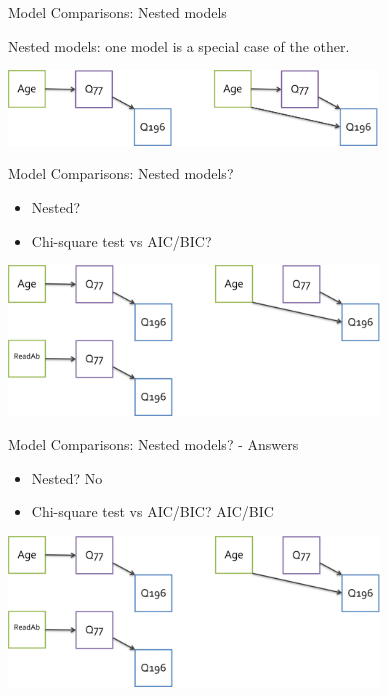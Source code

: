 \documentclass[10pt]{beamer}\usepackage[]{graphicx}\usepackage[]{xcolor}
\begin{document}
%
\begin{frame}{Model Comparisons: Nested models}

Nested models: one model is a special case of the other.

\vspace*{5mm}

\includegraphics[height=2cm,keepaspectratio=T] {nesting1.png}

\end{frame}
%
\begin{frame}{Model Comparisons: Nested models?}
\begin{itemize}
  \item{Nested?}
  \item{Chi-square test vs AIC/BIC?}
\end{itemize}

\vspace*{5mm}
\includegraphics[height=4cm,keepaspectratio=T] {nesting2.png}
\end{frame}
%
\begin{frame}{Model Comparisons: Nested models? - Answers}
\begin{itemize}
  \item{Nested? No}
  \item{Chi-square test vs AIC/BIC? AIC/BIC}
\end{itemize}

\vspace*{5mm}
\includegraphics[height=4cm,keepaspectratio=T] {nesting2.png}
\end{frame}
\end{document}
